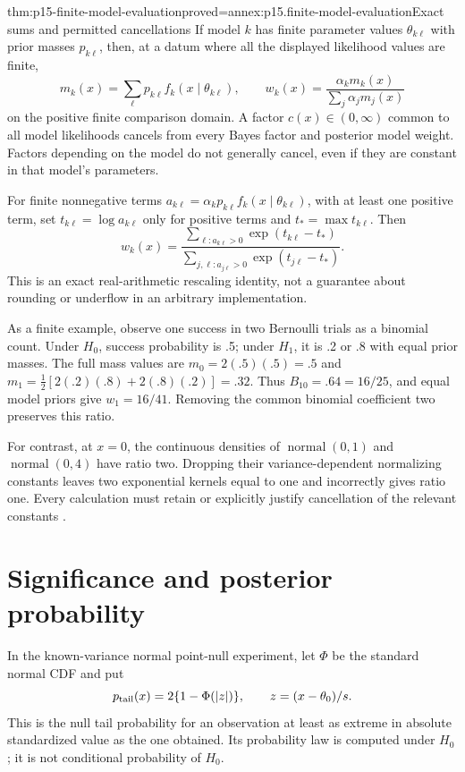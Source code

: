 \begin{hbtheorem}{thm:p15-finite-model-evaluation}{proved=annex:p15.finite-model-evaluation}{Exact sums and permitted cancellations}
If model \(k\) has finite parameter values \(\theta_{k\ell}\) with
prior masses \(p_{k\ell}\), then, at a datum where all the displayed
likelihood values are finite,
\[
 m_k(x)=\sum_\ell p_{k\ell}f_k(x\mid\theta_{k\ell}),\qquad
 w_k(x)=\frac{\alpha_km_k(x)}{\sum_j\alpha_jm_j(x)}
\]
on the positive finite comparison domain. A factor \(c(x)\in(0,\infty)\)
common to all model likelihoods cancels from every Bayes factor and
posterior model weight. Factors depending on the model do not generally
cancel, even if they are constant in that model's parameters.

For finite nonnegative terms \(a_{k\ell}=\alpha_kp_{k\ell}
f_k(x\mid\theta_{k\ell})\), with at least one positive term, set
\(t_{k\ell}=\log a_{k\ell}\) only for positive terms and
\(t_*=\max t_{k\ell}\). Then
\[
 w_k(x)=
 \frac{\sum_{\ell:a_{k\ell}>0}\exp(t_{k\ell}-t_*)}
      {\sum_{j,\ell:a_{j\ell}>0}\exp(t_{j\ell}-t_*)}.
\]
This is an exact real-arithmetic rescaling identity, not a guarantee about
rounding or underflow in an arbitrary implementation.
\end{hbtheorem}

As a finite example, observe one success in two Bernoulli trials as a
binomial count. Under \(H_0\), success probability is .5; under \(H_1\),
it is .2 or .8 with equal prior masses. The full mass values are
\(m_0=2(.5)(.5)=.5\) and
\(m_1=\tfrac12[2(.2)(.8)+2(.8)(.2)]=.32\).
Thus \(B_{10}=.64=16/25\), and equal model priors give \(w_1=16/41\).
Removing the common binomial coefficient two preserves this ratio.

For contrast, at \(x=0\), the continuous densities of
\(\operatorname{normal}(0,1)\) and \(\operatorname{normal}(0,4)\)
have ratio two. Dropping their variance-dependent normalizing constants
leaves two exponential kernels equal to one and incorrectly gives ratio
one. Every calculation must retain or explicitly justify cancellation of
the relevant constants \cite[Sec.~3.1]{KassRaftery1995BayesFactors}.

\section{Significance and posterior probability}
\label{sec:p15-bayes-factor-significance}

In the known-variance normal point-null experiment, let
\(\Phi\) be the standard normal CDF and put
\[
 p_{\rm tail}(x)=2\{1-\Phi(|z|)\},\qquad z=(x-\theta_0)/s.
\]
This is the null tail probability for an observation at least as extreme
in absolute standardized value as the one obtained. Its probability law
is computed under \(H_0\); it is not conditional probability of \(H_0\).

